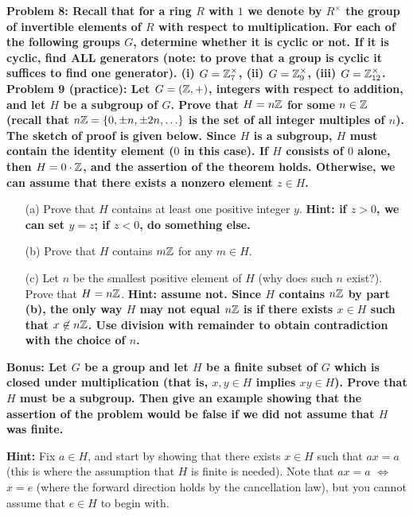 \documentclass[11pt]{amsart}
\begin{document}
\bf{Problem 8: }\rm Recall that for a ring $R$ with $1$ we denote by $R^{\times}$
the group of invertible elements of $R$ with respect to multiplication.
For each of the following groups $G$, determine
whether it is cyclic or not. If it is cyclic, find ALL generators
(note: to prove that a group is cyclic it suffices to find one generator).
\skv
\sk (i) $G={\mathbb Z}_7^{\times}$, \sk (ii) $G={\mathbb Z}_9^{\times}$, \sk (iii) $G={\mathbb Z}_{12}^{\times}$.
\skv
\bf{Problem 9 (practice): }\rm Let $G=({\mathbb Z},+)$, integers with respect to addition, and let
$H$ be a subgroup of $G$. Prove that $H=n{\mathbb Z}$ for some $n\in{\mathbb Z}$ (recall that
$n{\mathbb Z}=\{0,\pm n,\pm 2n,\ldots\}$ is the set of all integer multiples of $n$). 
The sketch of proof is given below.
\skv
Since $H$ is a subgroup, $H$ must contain the identity element
($0$ in this case). If $H$ consists of $0$ alone, then $H=0\cdot {\mathbb Z}$, and the assertion
of the theorem holds. Otherwise, we can assume that there exists a nonzero element $z\in H$.
\begin{itemize}
\item[(a)] Prove that $H$ contains at least one positive integer $y$. \bf{Hint: }\rm if $z>0$, 
we can set $y=z$; if $z<0$, do something else.
\item[(b)] Prove that $H$ contains $m{\mathbb Z}$ for any $m\in H$.
\item[(c)] Let $n$ be the smallest positive element of $H$ (why does such $n$ exist?).
Prove that $H=n{\mathbb Z}$. \bf{Hint: }\rm assume not. Since $H$ contains $n{\mathbb Z}$ by part (b),
the only way $H$ may not equal $n{\mathbb Z}$ is if there exists
$x\in H$ such that $x\not\in n{\mathbb Z}$. Use division with remainder to obtain contradiction
with the choice of $n$.
\end{itemize}
\bf{Bonus: }\rm Let $G$ be a group and let $H$ be a {\bf finite} subset of $G$ which is closed under multiplication
(that is, $x,y\in H$ implies $xy\in H$). Prove that $H$ must be a subgroup. Then give an example showing that
the assertion of the problem would be false if we did not assume that $H$ was finite.

{\bf Hint:} Fix $a\in H$, and start by showing that there exists $x\in H$ such that $ax=a$ (this is where the assumption
that $H$ is finite is needed). Note that $ax=a$ $\iff$ $x=e$ (where the forward direction holds by the cancellation law), 
but you cannot assume that $e\in H$ to begin with.
\end{document}

